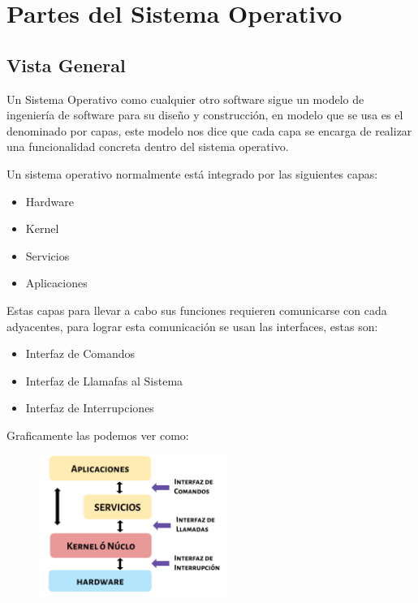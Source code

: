 \documentclass[12pt, fleqn]{report}                             %
\begin{document}
    \chapter{Partes del Sistema Operativo}

        \clearpage
        \section{Vista General}

            Un Sistema Operativo como cualquier otro software sigue un modelo de ingeniería de
            software para su diseño y construcción, en modelo que se usa es el denominado por capas,
            este modelo nos dice que cada capa se encarga de realizar una funcionalidad concreta
            dentro del sistema operativo.

            Un sistema operativo normalmente está integrado por las siguientes capas:
            \begin{itemize}
                \item Hardware
                \item Kernel
                \item Servicios        
                \item Aplicaciones
            \end{itemize}  

            Estas capas para llevar a cabo sus funciones requieren comunicarse con cada adyacentes,
            para lograr esta comunicación se usan las interfaces,
            estas son:
            \begin{itemize}
                \item Interfaz de Comandos
                \item Interfaz de Llamafas al Sistema
                \item Interfaz de Interrupciones        
            \end{itemize}  


            Graficamente las podemos ver como:

            \begin{figure}[h!]
                \centering
                \includegraphics[width=0.55\textwidth]{Capas}
            \end{figure}
\end{document}
